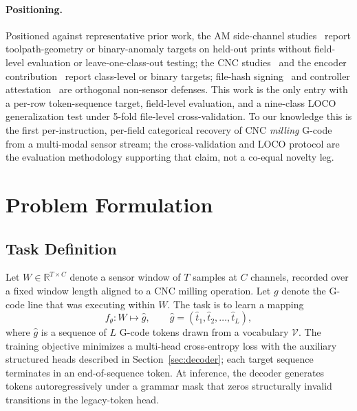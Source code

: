 \documentclass[sensors,article,submit,moreauthors,pdftex]{Definitions/mdpi}
\begin{document}
\paragraph{Positioning.} Positioned against representative prior work, the AM side-channel studies~\cite{alfaruque2016acoustic,song2016my,chhetri2016kcad,chattopadhyay2025video} report toolpath-geometry or binary-anomaly targets on held-out prints without field-level evaluation or leave-one-class-out testing; the CNC studies~\cite{stathatos2024cnn,coelho2024anomaly,kimmell2025cnc} and the encoder contribution~\cite{encoder_paper} report class-level or binary targets; file-hash signing~\cite{belikovetsky2017drowned,nist2024fmnet} and controller attestation~\cite{zonouz2014plc} are orthogonal non-sensor defenses. This work is the only entry with a per-row token-sequence target, field-level evaluation, and a nine-class LOCO generalization test under 5-fold file-level cross-validation.\label{sec:related-comparison} To our knowledge this is the first per-instruction, per-field categorical recovery of CNC \emph{milling} G-code from a multi-modal sensor stream; the cross-validation and LOCO protocol are the evaluation methodology supporting that claim, not a co-equal novelty leg.


\section{Problem Formulation}
\label{sec:problem}

\subsection{Task Definition}
\label{sec:task}

Let $W \in \mathbb{R}^{T \times C}$ denote a sensor window of $T$ samples at $C$ channels, recorded over a fixed window length aligned to a CNC milling operation. Let $g$ denote the G-code line that was executing within $W$. The task is to learn a mapping
\begin{equation*}
  f_\theta: W \mapsto \hat{g}, \qquad \hat{g} = (\hat{t}_1, \hat{t}_2, \dots, \hat{t}_L),
\end{equation*}
where $\hat{g}$ is a sequence of $L$ G-code tokens drawn from a vocabulary $\mathcal{V}$. The training objective minimizes a multi-head cross-entropy loss with the auxiliary structured heads described in Section~\ref{sec:decoder}; each target sequence terminates in an end-of-sequence token. At inference, the decoder generates tokens autoregressively under a grammar mask that zeros structurally invalid transitions in the legacy-token head.
\end{document}
